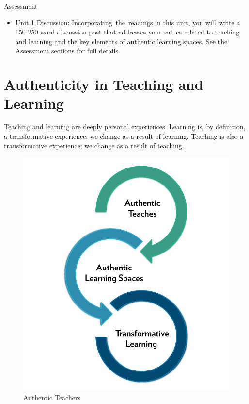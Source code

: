 \documentclass[
]{book}
\providecommand{\tightlist}{%
  \setlength{\itemsep}{0pt}\setlength{\parskip}{0pt}}
\begin{document}
\begin{assessment}
{Assessment}

\begin{itemize}
\tightlist
\item
  Unit 1 Discussion: Incorporating~the~readings in this unit, you
  will~write a 150-250 word discussion post that addresses your values
  related to teaching and learning and the key elements of authentic
  learning spaces. See the Assessment sections for full details.
\end{itemize}
\end{assessment}

\hypertarget{authenticity-in-teaching-and-learning}{%
\section{Authenticity in Teaching and Learning}\label{authenticity-in-teaching-and-learning}}

Teaching and learning are deeply personal experiences. Learning is, by definition, a transformative experience; we change as a result of learning. Teaching is also a transformative experience; we change as a result of teaching.

\begin{figure}
\centering
\includegraphics{assets/unit1/664-authentic-teachers.jpg}
\caption{Authentic Teachers}
\end{figure}
\end{document}
